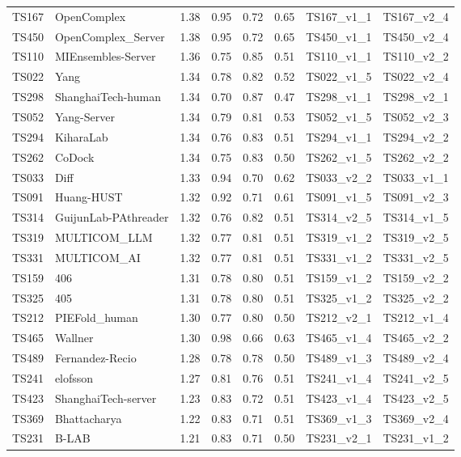 \begin{longtable}{llllllll}
TS167 & OpenComplex & 1.38 & 0.95 & 0.72 & 0.65 & TS167\_v1\_1 & TS167\_v2\_4 \\ 
TS450 & OpenComplex\_Server & 1.38 & 0.95 & 0.72 & 0.65 & TS450\_v1\_1 & TS450\_v2\_4 \\ 
TS110 & MIEnsembles-Server & 1.36 & 0.75 & 0.85 & 0.51 & TS110\_v1\_1 & TS110\_v2\_2 \\ 
TS022 & Yang & 1.34 & 0.78 & 0.82 & 0.52 & TS022\_v1\_5 & TS022\_v2\_4 \\ 
TS298 & ShanghaiTech-human & 1.34 & 0.70 & 0.87 & 0.47 & TS298\_v1\_1 & TS298\_v2\_1 \\ 
TS052 & Yang-Server & 1.34 & 0.79 & 0.81 & 0.53 & TS052\_v1\_5 & TS052\_v2\_3 \\ 
TS294 & KiharaLab & 1.34 & 0.76 & 0.83 & 0.51 & TS294\_v1\_1 & TS294\_v2\_2 \\ 
TS262 & CoDock & 1.34 & 0.75 & 0.83 & 0.50 & TS262\_v1\_5 & TS262\_v2\_2 \\ 
TS033 & Diff & 1.33 & 0.94 & 0.70 & 0.62 & TS033\_v2\_2 & TS033\_v1\_1 \\ 
TS091 & Huang-HUST & 1.32 & 0.92 & 0.71 & 0.61 & TS091\_v1\_5 & TS091\_v2\_3 \\ 
TS314 & GuijunLab-PAthreader & 1.32 & 0.76 & 0.82 & 0.51 & TS314\_v2\_5 & TS314\_v1\_5 \\ 
TS319 & MULTICOM\_LLM & 1.32 & 0.77 & 0.81 & 0.51 & TS319\_v1\_2 & TS319\_v2\_5 \\ 
TS331 & MULTICOM\_AI & 1.32 & 0.77 & 0.81 & 0.51 & TS331\_v1\_2 & TS331\_v2\_5 \\ 
TS159 & 406 & 1.31 & 0.78 & 0.80 & 0.51 & TS159\_v1\_2 & TS159\_v2\_2 \\ 
TS325 & 405 & 1.31 & 0.78 & 0.80 & 0.51 & TS325\_v1\_2 & TS325\_v2\_2 \\ 
TS212 & PIEFold\_human & 1.30 & 0.77 & 0.80 & 0.50 & TS212\_v2\_1 & TS212\_v1\_4 \\ 
TS465 & Wallner & 1.30 & 0.98 & 0.66 & 0.63 & TS465\_v1\_4 & TS465\_v2\_2 \\ 
TS489 & Fernandez-Recio & 1.28 & 0.78 & 0.78 & 0.50 & TS489\_v1\_3 & TS489\_v2\_4 \\ 
TS241 & elofsson & 1.27 & 0.81 & 0.76 & 0.51 & TS241\_v1\_4 & TS241\_v2\_5 \\ 
TS423 & ShanghaiTech-server & 1.23 & 0.83 & 0.72 & 0.51 & TS423\_v1\_4 & TS423\_v2\_5 \\ 
TS369 & Bhattacharya & 1.22 & 0.83 & 0.71 & 0.51 & TS369\_v1\_3 & TS369\_v2\_4 \\ 
TS231 & B-LAB & 1.21 & 0.83 & 0.71 & 0.50 & TS231\_v2\_1 & TS231\_v1\_2 \\ 

\end{longtable}
